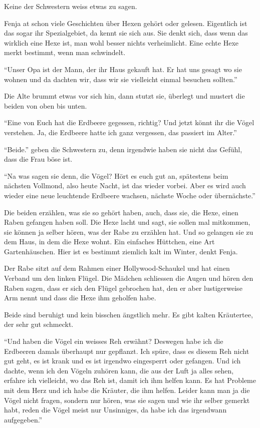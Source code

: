Keine der Schwestern weiss etwas zu sagen.

Fenja at schon viele Geschichten über Hexen gehört oder gelesen. Eigentlich ist das sogar ihr Spezialgebiet, da kennt sie sich aus. Sie denkt sich, dass wenn das wirklich eine Hexe ist, man wohl besser nichts verheimlicht. Eine echte Hexe merkt bestimmt, wenn man schwindelt.

\enquote{Unser Opa ist der Mann, der ihr Haus gekauft hat. Er hat uns gesagt wo sie wohnen und da dachten wir, dass wir sie vielleicht einmal besuchen sollten.}

Die Alte brummt etwas vor sich hin, dann stutzt sie, überlegt und mustert die beiden von oben bis unten.

\enquote{Eine von Euch hat die Erdbeere gegessen, richtig? Und jetzt könnt ihr die Vögel verstehen. Ja, die Erdbeere hatte ich ganz vergessen, das passiert im Alter.}

\enquote{Beide.} geben die Schwestern zu, denn irgendwie haben sie nicht das Gefühl, dass die Frau böse ist. 

\enquote{Na was sagen sie denn, die Vögel? Hört es euch gut an, spätestens beim nächsten Vollmond, also heute Nacht, ist das wieder vorbei. Aber es wird auch wieder eine neue leuchtende Erdbeere wachsen, nächste Woche oder übernächste.} 

Die beiden erzählen, was sie so gehört haben, auch, dass sie, die Hexe, einen Raben gefangen haben soll. Die Hexe lacht und sagt, sie sollen mal mitkommen, sie können ja selber hören, was der Rabe zu erzählen hat. Und so gelangen sie zu dem Haus, in dem die Hexe wohnt. Ein einfaches Hüttchen, eine Art Gartenhäuschen. Hier ist es bestimmt ziemlich kalt im Winter, denkt Fenja. 

Der Rabe sitzt auf dem Rahmen einer Hollywood-Schaukel und hat einen Verband um den linken Flügel. Die Mädchen schliessen die Augen und hören den Raben sagen, dass er sich den Flügel gebrochen hat, den er aber lustigerweise Arm nennt und dass die Hexe ihm geholfen habe.

Beide sind beruhigt und kein bisschen ängstlich mehr. Es gibt kalten Kräutertee, der sehr gut schmeckt. 

\enquote{Und haben die Vögel ein weisses Reh erwähnt? Deswegen habe ich die Erdbeeren damals überhaupt nur gepflanzt. Ich spüre, dass es diesem Reh nicht gut geht, es ist krank und es ist irgendwo eingesperrt oder gefangen. Und ich dachte, wenn ich den Vögeln zuhören kann, die aus der Luft ja alles sehen, erfahre ich vielleicht, wo das Reh ist, damit ich ihm helfen kann. Es hat Probleme mit dem Herz und ich habe die Kräuter, die ihm helfen. Leider kann man ja die Vögel nicht fragen, sondern nur hören, was sie sagen und wie ihr selber gemerkt habt, reden die Vögel meist nur Unsinniges, da habe ich das irgendwann aufgegeben.}

